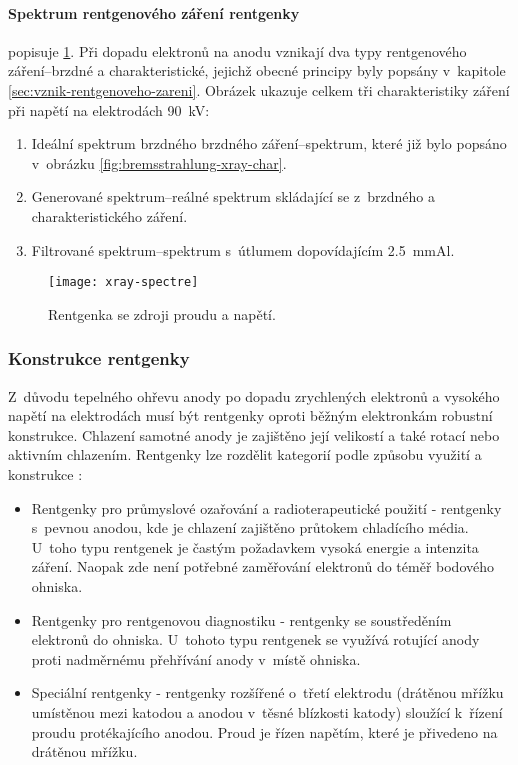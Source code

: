 \paragraph{Spektrum rentgenového záření rentgenky}
popisuje \cref{fig:xray-spectre}. Při dopadu elektronů na anodu vznikají dva typy rentgenového záření--brzdné a charakteristické, jejichž obecné principy byly popsány v~kapitole \ref{sec:vznik-rentgenoveho-zareni}. Obrázek ukazuje celkem tři charakteristiky záření při napětí na elektrodách \SI{90}{\kV}:
\begin{enumerate}[label=(\alph*)]
\item Ideální spektrum brzdného brzdného záření--spektrum, které již bylo popsáno v~obrázku \ref{fig:bremsstrahlung-xray-char}.
\item Generované spektrum--reálné spektrum skládající se z~brzdného a charakteristického záření.
\item Filtrované spektrum--spektrum s~útlumem dopovídajícím \SI{2.5}{\mm}Al.
\end{enumerate}

\begin{figure}[hb]
\centering
\texttt{[image: xray-spectre]}
\caption{Rentgenka se zdroji proudu a napětí. \cite[str. 93]{Diagnostic-Radiology-Physics}}
\label{fig:xray-spectre}
\end{figure}

\subsubsection{Konstrukce rentgenky}
Z~důvodu tepelného ohřevu anody po dopadu zrychlených elektronů a vysokého napětí na elektrodách musí být rentgenky oproti běžným elektronkám robustní konstrukce. Chlazení samotné anody je zajištěno její velikostí a také rotací  nebo aktivním chlazením. Rentgenky lze rozdělit kategorií podle způsobu využití a konstrukce \cite[kap. 3.2]{AstroNuklFyzika-JadRadMetody}:
\begin{itemize}
\item Rentgenky pro průmyslové ozařování a radioterapeutické použití - rentgenky s~pevnou anodou, kde je chlazení zajištěno průtokem chladícího média. U~toho typu rentgenek je častým požadavkem vysoká energie a intenzita záření. Naopak zde není potřebné zaměřování elektronů do téměř bodového ohniska. 
\item Rentgenky pro rentgenovou diagnostiku - rentgenky se soustředěním elektronů do ohniska. U~tohoto typu rentgenek se využívá rotující anody proti nadměrnému přehřívání anody v~místě ohniska.
\item Speciální rentgenky - rentgenky rozšířené o~třetí elektrodu (drátěnou mřížku umístěnou mezi katodou a anodou v~těsné blízkosti katody) sloužící k~řízení proudu protékajícího anodou. Proud je řízen napětím, které je přivedeno na drátěnou mřížku.
\end{itemize}

